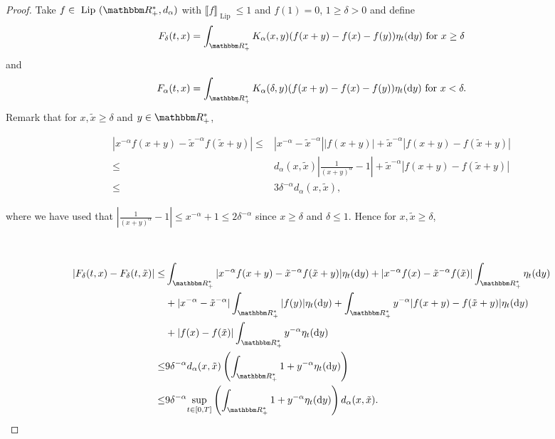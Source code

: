 \documentclass[a4paper,11pt, reqno]{amsart}
\newcommand{\dd}{\mathop{}\!\mathrm{d}}
\newcommand{\1}{\mathbbm{1}}
\theoremstyle{plain}
\theoremstyle{definition}
\begin{document}
\begin{proof}
  Take $f \in  \text{ Lip } (\RR_+^{\ast}, d_{\alpha})$ with $\llbracket f
  \rrbracket_{ \text{ Lip } } \le 1$ and $f (1) = 0$, $1 \ge \delta >
  0$ and define
  \[ F_{\delta} (t, x) = \int_{\RR^{\ast}_+} K_{\alpha} (x, y) (f (x +
     y) - f (x) - f (y)) \eta_t (\dd y)  \text{ for } x \ge \delta \]
  and
  \[ F_{\alpha} (t, x) = \int_{\RR^{\ast}_+} K_{\alpha} (\delta, y) (f
     (x + y) - f (x) - f (y)) \eta_t (\dd y)  \text{ for } x < \delta . \]
  Remark that for $x, \tilde{x} \ge \delta$ and $y \in
  \RR_+^{\ast}$,
  
  \begin{align*}
    | x^{- \alpha} f (x + y) - \tilde{x}^{- \alpha} f (\tilde{x} + y) |
    \le & | x^{- \alpha} - \tilde{x}^{- \alpha} | | f (x + y) | +
    \tilde{x}^{- \alpha} | f (x + y) - f (\tilde{x} + y) |\\
    \le & d_{\alpha} (x, \tilde{x}) \left| \frac{1}{(x + y)^{\alpha}} -
    1 \right| + \tilde{x}^{- \alpha} | f (x + y) - f (\tilde{x} + y) |\\
    \le & 3 \delta^{- \alpha} d_{\alpha} (x, \tilde{x}),
  \end{align*}
  
  where we have used that $\left| \frac{1}{(x + y)^{\alpha}} - 1 \right|
  \le x^{- \alpha} + 1 \le 2 \delta^{- \alpha}$ since $x \ge
  \delta$ and $\delta \le 1$. Hence for $x, \tilde{x} \ge \delta$,
  
  \
  
  \begin{align*}
    | F_{\delta} (t, x) - F_{\delta} (t, \tilde{x}) | \le &
    \int_{\RR^{\ast}_+} | x^{- \alpha} f (x + y) - \tilde{x}^{- \alpha}
    f (\tilde{x} + y) | \eta_t (\dd y) + | x^{- \alpha} f (x) -
    \tilde{x}^{- \alpha} f (\tilde{x}) | \int_{\RR^{\ast}_+} \eta_t
    (\dd y)\\
    & + | x^{- \alpha} - \tilde{x}^{- \alpha} | \int_{\RR^{\ast}_+} |
    f (y) | \eta_t (\dd y) + \int_{\RR^{\ast}_+} y^{- \alpha} | f (x
    + y) - f (\tilde{x} + y) | \eta_t (\dd y)\\
    & + | f (x) - f (\tilde{x}) | \int_{\RR^{\ast}_+} y^{- \alpha}
    \eta_t (\dd y) \\
    \le & 9 \delta^{- \alpha} d_{\alpha} (x, \tilde{x}) \left(
    \int_{\RR_+^{\ast}} 1 + y^{- \alpha} \eta_t (\dd y) \right)\\
    \le & 9 \delta^{- \alpha} \underset{t \in [0, T]}{\sup} \left(
    \int_{\RR_+^{\ast}} 1 + y^{- \alpha} \eta_t (\dd y) \right)
    d_{\alpha} (x, \tilde{x}) .
  \end{align*}
  

\end{proof}
\end{document}
